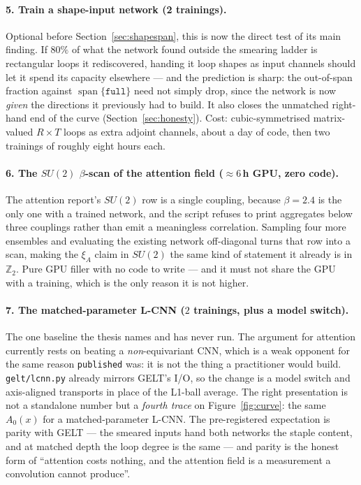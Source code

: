\documentclass[11pt,a4paper]{article}
\newcommand{\Azero}{A_0}
\newcommand{\spn}{\operatorname{span}}
\newcommand{\arm}[1]{\texttt{#1}}
\begin{document}
\paragraph{5. Train a shape-input network (2 trainings).} Optional before
Section~\ref{sec:shapespan}, this is now the direct test of its main finding. If
$80\%$ of what the network found outside the smearing ladder is rectangular
loops it rediscovered, handing it loop shapes as input channels should let it
spend its capacity elsewhere --- and the prediction is sharp: the out-of-span
fraction against $\spn\{\arm{full}\}$ need not simply drop, since the network is
now \emph{given} the directions it previously had to build. It also closes the
unmatched right-hand end of the curve (Section~\ref{sec:honesty}). Cost:
cubic-symmetrised matrix-valued $R\times T$ loops as extra adjoint channels,
about a day of code, then two trainings of roughly eight hours each.

\paragraph{6. The $SU(2)$ $\beta$-scan of the attention field ($\approx6$\,h
GPU, zero code).} The attention report's $SU(2)$ row is a single coupling,
because $\beta = 2.4$ is the only one with a trained network, and the script
refuses to print aggregates below three couplings rather than emit a meaningless
correlation. Sampling four more ensembles and evaluating the existing network
off-diagonal turns that row into a scan, making the $\xi_A$ claim in $SU(2)$ the
same kind of statement it already is in $\mathbb{Z}_2$. Pure GPU filler with no
code to write --- and it must not share the GPU with a training, which is the
only reason it is not higher.

\paragraph{7. The matched-parameter L-CNN ($2$ trainings, plus a model switch).}
The one baseline the thesis names and has never run. The argument for attention
currently rests on beating a \emph{non}-equivariant CNN, which is a weak
opponent for the same reason \arm{published} was: it is not the thing a
practitioner would build. \texttt{gelt/lcnn.py} already mirrors GELT's I/O, so
the change is a model switch and axis-aligned transports in place of the L1-ball
average. The right presentation is not a standalone number but a \emph{fourth
trace} on Figure~\ref{fig:curve}: the same $\Azero(x)$ for a matched-parameter
L-CNN. The pre-registered expectation is parity with GELT --- the smeared inputs
hand both networks the staple content, and at matched depth the loop degree is
the same --- and parity is the honest form of ``attention costs nothing, and the
attention field is a measurement a convolution cannot produce''.
\end{document}
